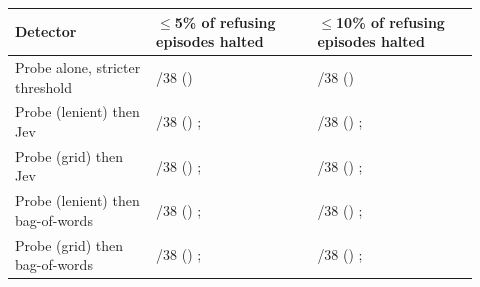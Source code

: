 \begin{tabular}{@{}>{\raggedright\arraybackslash}p{0.28\linewidth}>{\raggedright\arraybackslash}p{0.32\linewidth}>{\raggedright\arraybackslash}p{0.32\linewidth}@{}}
\toprule
Detector & $\le$5\% of refusing episodes halted & $\le$10\% of refusing episodes halted \\
\midrule
Probe alone, stricter threshold & \cascadeProbeAloneFiveCaught{}/38 (\cascadeProbeAloneFive{}) \cascadeProbeAloneFiveCI{} & \cascadeProbeAloneTenCaught{}/38 (\cascadeProbeAloneTen{}) \cascadeProbeAloneTenCI{} \\
Probe (lenient) then Jev & \cascadeJevLenientFiveCaught{}/38 (\cascadeJevLenientFive{}) \cascadeJevLenientFiveCI{}; \cascadeJevLenientFiveGap{} & \cascadeJevLenientTenCaught{}/38 (\cascadeJevLenientTen{}) \cascadeJevLenientTenCI{}; \cascadeJevLenientTenGap{} \\
Probe (grid) then Jev & \cascadeJevGridFiveCaught{}/38 (\cascadeJevGridFive{}) \cascadeJevGridFiveCI{}; \cascadeJevGridFiveGap{} & \cascadeJevGridTenCaught{}/38 (\cascadeJevGridTen{}) \cascadeJevGridTenCI{}; \cascadeJevGridTenGap{} \\
Probe (lenient) then bag-of-words & \cascadeBowLenientFiveCaught{}/38 (\cascadeBowLenientFive{}) \cascadeBowLenientFiveCI{}; \cascadeBowLenientFiveGap{} & \cascadeBowLenientTenCaught{}/38 (\cascadeBowLenientTen{}) \cascadeBowLenientTenCI{}; \cascadeBowLenientTenGap{} \\
Probe (grid) then bag-of-words & \cascadeBowGridFiveCaught{}/38 (\cascadeBowGridFive{}) \cascadeBowGridFiveCI{}; \cascadeBowGridFiveGap{} & \cascadeBowGridTenCaught{}/38 (\cascadeBowGridTen{}) \cascadeBowGridTenCI{}; \cascadeBowGridTenGap{} \\
\bottomrule
\end{tabular}
